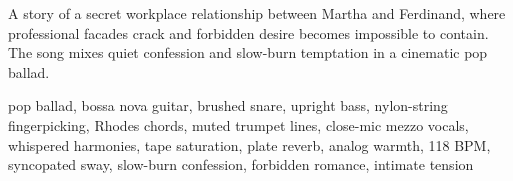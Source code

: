 

\begin{notes}
A story of a secret workplace relationship between Martha and Ferdinand, where professional facades crack and forbidden desire becomes impossible to contain. %
The song mixes quiet confession and slow-burn temptation in a cinematic pop ballad.
\end{notes}

\begin{style}
pop ballad, bossa nova guitar, brushed snare, upright bass, nylon-string fingerpicking, Rhodes chords, muted trumpet lines, close-mic mezzo vocals, whispered harmonies, tape saturation, plate reverb, analog warmth, 118 BPM, syncopated sway, slow-burn confession, forbidden romance, intimate tension
\end{style}

